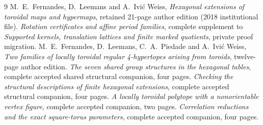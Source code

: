 \documentclass[10pt,a4paper]{article}
\begin{document}
\begin{thebibliography}{9}
 M.~E.~Fernandes, D.~Leemans and A.~Ivi\'c Weiss,
\emph{Hexagonal extensions of toroidal maps and hypermaps}, retained
21-page author edition (2018 institutional file).
 \emph{Rotation certificates and affine period families},
complete supplement to \emph{Supported kernels, translation lattices
and finite marked quotients}, private proof migration.
 M.~E.~Fernandes, D.~Leemans, C.~A.~Piedade and
A.~Ivi\'c Weiss, \emph{Two families of locally toroidal regular
4-hypertopes arising from toroids}, twelve-page author edition.
 \emph{The seven shared group structures in the hexagonal tables},
complete accepted shared structural companion, four pages.
 \emph{Checking the structural descriptions of finite
hexagonal extensions}, complete accepted structural companion, four pages.
 \emph{A locally toroidal polytope with a nonorientable vertex
figure}, complete accepted companion, two pages.
 \emph{Correlation reductions and the exact square-torus
parameters}, complete accepted companion, four pages.
\end{thebibliography}
\end{document}
